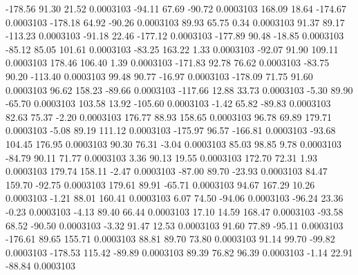      -178.56       91.30       21.52     0.0003103
      -94.11       67.69      -90.72     0.0003103
      168.09       18.64     -174.67     0.0003103
     -178.18       64.92      -90.26     0.0003103
       89.93       65.75        0.34     0.0003103
       91.37       89.17     -113.23     0.0003103
      -91.18       22.46     -177.12     0.0003103
     -177.89       90.48      -18.85     0.0003103
      -85.12       85.05      101.61     0.0003103
      -83.25      163.22        1.33     0.0003103
      -92.07       91.90      109.11     0.0003103
      178.46      106.40        1.39     0.0003103
     -171.83       92.78       76.62     0.0003103
      -83.75       90.20     -113.40     0.0003103
       99.48       90.77      -16.97     0.0003103
     -178.09       71.75       91.60     0.0003103
       96.62      158.23      -89.66     0.0003103
     -117.66       12.88       33.73     0.0003103
       -5.30       89.90      -65.70     0.0003103
      103.58       13.92     -105.60     0.0003103
       -1.42       65.82      -89.83     0.0003103
       82.63       75.37       -2.20     0.0003103
      176.77       88.93      158.65     0.0003103
       96.78       69.89      179.71     0.0003103
       -5.08       89.19      111.12     0.0003103
     -175.97       96.57     -166.81     0.0003103
      -93.68      104.45      176.95     0.0003103
       90.30       76.31       -3.04     0.0003103
       85.03       98.85        9.78     0.0003103
      -84.79       90.11       71.77     0.0003103
        3.36       90.13       19.55     0.0003103
      172.70       72.31        1.93     0.0003103
      179.74      158.11       -2.47     0.0003103
      -87.00       89.70      -23.93     0.0003103
       84.47      159.70      -92.75     0.0003103
      179.61       89.91      -65.71     0.0003103
       94.67      167.29       10.26     0.0003103
       -1.21       88.01      160.41     0.0003103
        6.07       74.50      -94.06     0.0003103
      -96.24       23.36       -0.23     0.0003103
       -4.13       89.40       66.44     0.0003103
       17.10       14.59      168.47     0.0003103
      -93.58       68.52      -90.50     0.0003103
       -3.32       91.47       12.53     0.0003103
       91.60       77.89      -95.11     0.0003103
     -176.61       89.65      155.71     0.0003103
       88.81       89.70       73.80     0.0003103
       91.14       99.70      -99.82     0.0003103
     -178.53      115.42      -89.89     0.0003103
       89.39       76.82       96.39     0.0003103
       -1.14       22.91      -88.84     0.0003103
